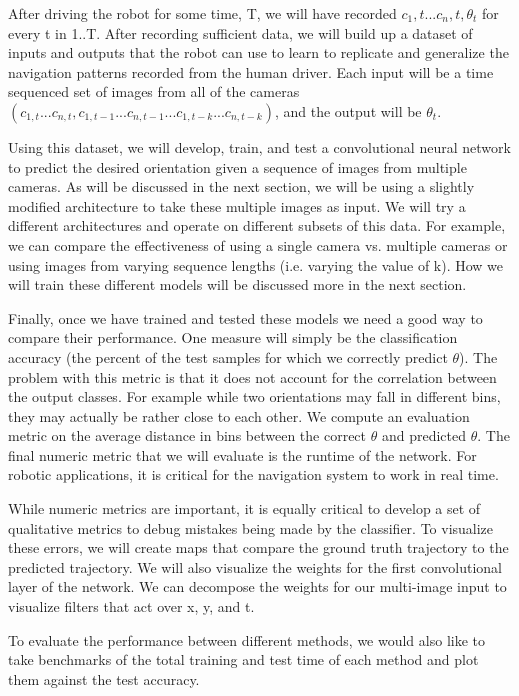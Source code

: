 \documentclass[10pt,twocolumn,letterpaper]{article}
\begin{document}
After driving the robot for some time, T, we will have recorded $c_1,t...c_n,t, \theta_t$ for every t in 1..T. After recording sufficient data, we will build up a dataset of inputs and outputs that the robot can use to learn to replicate and generalize the navigation patterns recorded from the human driver. Each input will be a time sequenced set of images from all of the cameras $(c_{1,t}...c_{n,t}, c_{1,t-1}...c_{n,t-1}...c_{1,t-k}...c_{n,t-k})$, and the output will be $\theta_t$.

Using this dataset, we will develop, train, and test a convolutional neural network to predict the desired orientation given a sequence of images from multiple cameras. As will be discussed in the next section, we will be using a slightly modified architecture to take these multiple images as input. We will try a different architectures and operate on different subsets of this data. For example, we can compare the effectiveness of using a single camera vs. multiple cameras or using images from varying sequence lengths (i.e. varying the value of k). How we will train these different models will be discussed more in the next section.

Finally, once we have trained and tested these models we need a good way to compare their performance. One measure will simply be the classification accuracy (the percent of the test samples for which we correctly predict $\theta$). The problem with this metric is that it does not account for the correlation between the output classes. For example while two orientations may fall in different bins, they may actually be rather close to each other. We compute an evaluation metric on the average distance in bins between the correct $\theta$ and predicted $\theta$. The final numeric metric that we will evaluate is the runtime of the network. For robotic applications, it is critical for the navigation system to work in real time.

While numeric metrics are important, it is equally critical to develop a set of qualitative metrics to debug mistakes being made by the classifier. To visualize these errors, we will create maps that compare the ground truth trajectory to the predicted trajectory. We will also visualize the weights for the first convolutional layer of the network. We can decompose the weights for our multi-image input to visualize filters that act over x, y, and t.

To evaluate the performance between different methods, we would also like to take benchmarks of the total training and test time of each method and plot them against the test accuracy.
\end{document}
